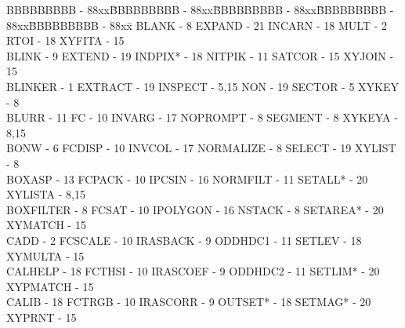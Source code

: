 {\begin{tabbing}
BBBBBBBBB - 88xx\=BBBBBBBBB - 88xx\=BBBBBBBBB - 88xx\=BBBBBBBBB - 88xx\=BBBBBBBBB - 88xx\=\kill
 BLANK - 8                               \>EXPAND - 21
   \>INCARN - 18                             \>
 MULT - 2                                \>RTOI - 18
   \>XYFITA - 15                             \\
 BLINK - 9                               \>EXTEND - 19
   \>INDPIX* - 18                            \>
 NITPIK - 11                             \>SATCOR - 15
   \>XYJOIN - 15                             \\
 BLINKER - 1                             \>EXTRACT - 19
   \>INSPECT - 5,15                          \>
 NON - 19                                \>SECTOR - 5
   \>XYKEY - 8                               \\
 BLURR - 11                              \>FC - 10
   \>INVARG - 17                             \>
 NOPROMPT - 8                            \>SEGMENT - 8
   \>XYKEYA - 8,15                           \\
 BONW - 6                                \>FCDISP - 10
   \>INVCOL - 17                             \>
 NORMALIZE - 8                           \>SELECT - 19
   \>XYLIST - 8                              \\
 BOXASP - 13                             \>FCPACK - 10
   \>IPCSIN - 16                             \>
 NORMFILT - 11                           \>SETALL* - 20
   \>XYLISTA - 8,15                          \\
 BOXFILTER - 8                           \>FCSAT - 10
   \>IPOLYGON - 16                           \>
 NSTACK - 8                              \>SETAREA* - 20
   \>XYMATCH - 15                            \\
 CADD - 2                                \>FCSCALE - 10
   \>IRASBACK - 9                            \>
 ODDHDC1 - 11                            \>SETLEV - 18
   \>XYMULTA - 15                            \\
 CALHELP - 18                            \>FCTHSI - 10
   \>IRASCOEF - 9                            \>
 ODDHDC2 - 11                            \>SETLIM* - 20
   \>XYPMATCH - 15                           \\
 CALIB - 18                              \>FCTRGB - 10
   \>IRASCORR - 9                            \>
 OUTSET* - 18                            \>SETMAG* - 20
   \>XYPRNT - 15                             \\

\end{tabbing}}

